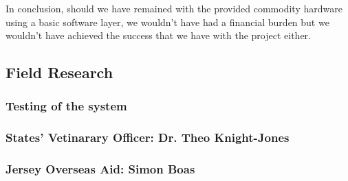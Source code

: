 In conclusion, should we have remained with the provided commodity hardware using a basic software layer, we wouldn't have had a financial burden but we wouldn't have achieved the success that we have with the project either.

\subsection{Field Research}

\subsubsection{Testing of the system}


\subsubsection{States' Vetinarary Officer: Dr. Theo Knight-Jones}


\subsubsection{Jersey Overseas Aid: Simon Boas}

